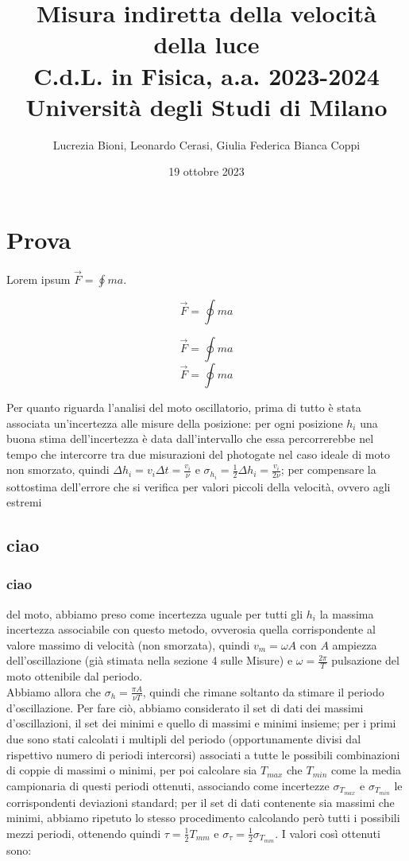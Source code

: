 \documentclass[]{article}
\title{%
    \Huge Misura indiretta della velocità della luce \\
    \Large C.d.L. in Fisica, a.a. 2023-2024 \\ Università degli Studi di Milano}
\author{\LARGE Lucrezia Bioni, Leonardo Cerasi, Giulia Federica Bianca Coppi}
\date{19 ottobre 2023}
\let\oldsection\section%
\renewcommand{\section}{%
	\renewcommand{\theequation}{\thesection.\arabic{equation}}%
	\oldsection}%
\let\oldsubsection\subsection%
\renewcommand{\subsection}{%
	\renewcommand{\theequation}{\thesubsection.\arabic{equation}}%
	\oldsubsection}%
\begin{document}
    \maketitle

    \section{ Prova}

    Lorem ipsum $ \vec{F} = \oint m a $.

    $$
    \vec{F} = \oint m a
    $$

    \begin{equation}
        \vec{F} = \oint m a
    \end{equation}
    \begin{equation}
        \vec{F} = \oint m a
    \end{equation}

    Per quanto riguarda l'analisi del moto oscillatorio, prima di tutto è stata associata un'incertezza alle misure della posizione: per ogni posizione $h_i$ una buona stima dell'incertezza è data dall'intervallo che essa percorrerebbe nel tempo che intercorre tra due misurazioni del photogate nel caso ideale di moto non smorzato, quindi $\Delta h_i = v_i \Delta t = \frac{v_i}{\nu}$ e $\sigma_{h_i} = \frac{1}{2} \Delta h_i = \frac{v_i}{2\nu}$; per compensare la sottostima dell'errore che si verifica per valori piccoli della velocità, ovvero agli estremi
    
    \subsection{ciao}

    \subsubsection*{ciao}

    del moto, abbiamo preso come incertezza uguale per tutti gli $h_i$ la massima incertezza associabile con questo metodo, ovverosia quella corrispondente al valore massimo di velocità (non smorzata), quindi $v_m = \omega A$ con $A$ ampiezza dell'oscillazione (già stimata nella sezione 4 sulle Misure) e $\omega = \frac{2\pi}{T}$ pulsazione del moto ottenibile dal periodo. \\
    Abbiamo allora che $\sigma_h = \frac{\pi A}{\nu T}$, quindi che rimane soltanto da stimare il periodo d'oscillazione. Per fare ciò, abbiamo considerato il set di dati dei massimi d'oscillazioni, il set dei minimi e quello di massimi e minimi insieme; per i primi due sono stati calcolati i multipli del periodo (opportunamente divisi dal rispettivo numero di periodi intercorsi) associati a tutte le possibili combinazioni di coppie di massimi o minimi, per poi calcolare sia $T_{max}$ che $T_{min}$ come la media campionaria di questi periodi ottenuti, associando come incertezze $\sigma_{T_{max}}$ e $\sigma_{T_{min}}$ le corrispondenti deviazioni standard; per il set di dati contenente sia massimi che minimi, abbiamo ripetuto lo stesso procedimento calcolando però tutti i possibili mezzi periodi, ottenendo quindi $\tau = \frac{1}{2}T_{mm}$ e $\sigma_\tau = \frac{1}{2}\sigma_{T_{mm}}$. I valori così ottenuti sono:
\end{document}
